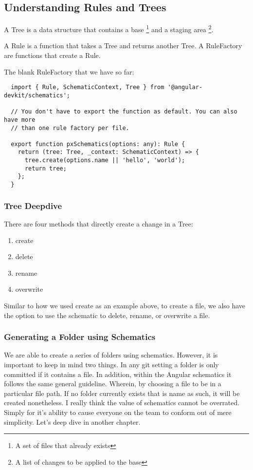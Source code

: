 \subsection{ Understanding Rules and Trees }
A Tree is a data structure that contains a base \footnote{A set of files that already exists}
and a staging area \footnote{A list of changes to be applied to the base}.

A Rule is a function that takes a Tree and returns another Tree. A RuleFactory
are functions that create a Rule.

The blank RuleFactory that we have so far:

\begin{lstlisting}
  import { Rule, SchematicContext, Tree } from '@angular-devkit/schematics';

  // You don't have to export the function as default. You can also have more
  // than one rule factory per file.

  export function pxSchematics(options: any): Rule {
    return (tree: Tree, _context: SchematicContext) => {
      tree.create(options.name || 'hello', 'world');
      return tree;
    };
  }

\end{lstlisting}


\subsubsection{ Tree Deepdive}
There are four methods that directly create a change in a Tree:
\begin{enumerate}
  \item create
  \item delete
  \item rename
  \item overwrite
\end{enumerate}

Similar to how we used create as an example above, to create a file, we also
have the option to use the schematic to delete, rename, or overwrite a file.

\subsubsection{ Generating a Folder using Schematics }
We are able to create a series of folders using schematics. However, it is
important to keep in mind two things. In any git setting a folder is only
committed if it contains a file. In addition, within the Angular schematics
it follows the same general guideline. Wherein, by choosing a file to be in a
particular file path. If no folder currently exists that is name as such, it
will be created nonetheless. I really think the value of schematics cannot be
overrated. Simply for it's ability to cause everyone on the team to conform out
of mere simplicity. Let's deep dive in another chapter.
